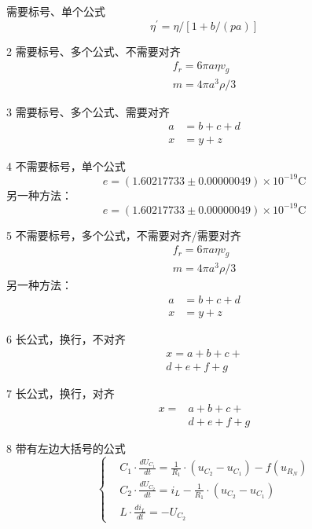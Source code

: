 \documentclass[12pt,a4paper,UTF8]{ctexart}
\begin{document}


 需要标号、单个公式
		\begin{equation}
		\eta^{\prime}=\eta /[1+b /(p a)]
		\end{equation}

	2 需要标号、多个公式、不需要对齐
		\begin{gather}
		f_r=6\pi a \eta v_g   \\
		m=4 \pi a^{3} \rho / 3
		\end{gather}

	3 需要标号、多个公式、需要对齐
		\begin{align}
		a &= b+c+d \\
		x &= y+z
		\end{align}

	4 不需要标号，单个公式
		\[e=(1.60217733 \pm 0.00000049) \times 10^{-19} \mathrm{C}\]
		另一种方法：
		\begin{equation*}
		e=(1.60217733 \pm 0.00000049) \times 10^{-19} \mathrm{C}
		\end{equation*}

	5 不需要标号，多个公式，不需要对齐/需要对齐
		\begin{gather*}
		f_r=6\pi a \eta v_g   \\
		m=4 \pi a^{3} \rho / 3
		\end{gather*}
		另一种方法：
		\begin{align*}
		a &= b+c+d \\
		x &= y+z
		\end{align*}

	6 长公式，换行，不对齐
		\begin{multline}
		x = a+b+c+{} \\
		d+e+f+g
		\end{multline}

	7 长公式，换行，对齐
		\[\begin{aligned}
		x ={}&a+b+c+{} \\
		&d+e+f+g
		\end{aligned}\]

	8 带有左边大括号的公式
	\[\left\{
		\begin{aligned}
		&C_{1} \cdot \frac{d U_{C_{1}}}{d t}=\frac{1}{R_{1}} \cdot(u_{C_{2}}-u_{C_{1}})-f(u_{R_{N}}) \\
		&C_{2} \cdot \frac{d U_{C_{2}}}{d t}=i_{L}-\frac{1}{R_{1}} \cdot(u_{C_{2}}-u_{C_{1}}) \\
		&L \cdot \frac{d i_{L}}{d t}=-U_{C_{2}}
		\end{aligned}
	   \right.
	\]
\end{document}
